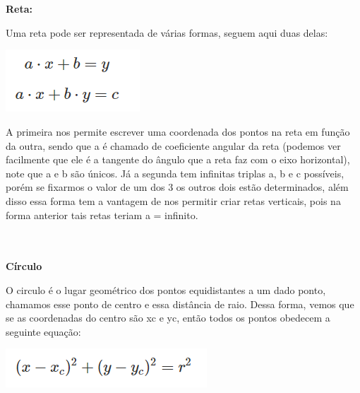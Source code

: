 \documentclass[a4paper,12pt]{article}
\begin{document}
\\~\\\noindent\textbf{Reta:}

\noindent Uma reta pode ser representada de várias formas, seguem aqui duas delas:

\begin{center}
  \includegraphics[width=\linewidth/4]{figures/matematica_computacional/geometria_basica/equacao_reta.png}
\end{center}

\noindent A primeira nos permite escrever uma coordenada dos pontos na reta em função da outra, sendo que a é chamado de coeficiente angular da reta (podemos ver facilmente que ele é a tangente do ângulo que a reta faz com o eixo horizontal), note que a e b são únicos. Já a segunda tem infinitas triplas a, b e c possíveis, porém se fixarmos o valor de um dos 3 os outros dois estão determinados, além disso essa forma tem a vantagem de nos permitir criar retas verticais, pois na forma anterior tais retas teriam a = infinito.

\\~\\\noindent\textbf{Círculo}

\noindent O circulo é o lugar geométrico dos pontos equidistantes a um dado ponto, chamamos esse ponto de centro e essa distância de raio. Dessa forma, vemos que se as coordenadas do centro são xc e yc, então todos os pontos obedecem a seguinte equação:

\begin{center}
  \includegraphics[width=\linewidth/3]{figures/matematica_computacional/geometria_basica/equacao_circulo.png}
\end{center}
\end{document}
